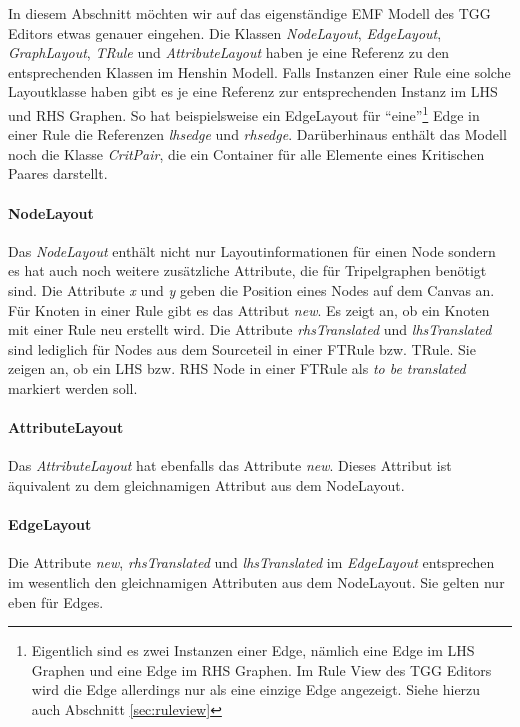 In diesem Abschnitt möchten wir auf das eigenständige EMF Modell des TGG Editors etwas genauer eingehen. Die Klassen \emph{NodeLayout}, \emph{EdgeLayout}, \emph{GraphLayout}, \emph{TRule} und \emph{AttributeLayout} haben je eine Referenz zu den entsprechenden Klassen im Henshin Modell. Falls Instanzen einer Rule eine solche Layoutklasse haben gibt es je eine Referenz zur entsprechenden Instanz im LHS und RHS Graphen. So hat beispielsweise ein EdgeLayout für "`eine"'\footnote{Eigentlich sind es zwei Instanzen einer Edge, nämlich eine Edge im LHS Graphen und eine Edge im RHS Graphen. Im Rule View des TGG Editors wird die Edge allerdings nur als eine einzige Edge angezeigt. Siehe hierzu auch Abschnitt \ref{sec:ruleview}} Edge in einer Rule die Referenzen \emph{lhsedge} und \emph{rhsedge}.
Darüberhinaus enthält das Modell noch die Klasse \emph{CritPair}, die ein Container für alle Elemente eines Kritischen Paares darstellt.

\paragraph{NodeLayout}
Das \emph{NodeLayout} enthält nicht nur Layoutinformationen für einen Node sondern es hat auch noch weitere zusätzliche Attribute, die für Tripelgraphen benötigt sind. Die Attribute \emph{x} und \emph{y} geben die Position eines Nodes auf dem Canvas an. Für Knoten in einer Rule gibt es  das Attribut \emph{new}. Es zeigt an, ob ein Knoten mit einer Rule neu erstellt wird. Die Attribute \emph{rhsTranslated} und \emph{lhsTranslated} sind lediglich für Nodes aus dem Sourceteil in einer FTRule bzw. TRule. Sie zeigen an, ob ein LHS bzw. RHS Node in einer FTRule als \emph{to be translated} markiert werden soll.
\paragraph{AttributeLayout}
Das \emph{AttributeLayout} hat ebenfalls das Attribute \emph{new}. Dieses Attribut ist äquivalent zu dem gleichnamigen Attribut aus dem NodeLayout.
\paragraph{EdgeLayout}
Die Attribute \emph{new}, \emph{rhsTranslated} und \emph{lhsTranslated} im \emph{EdgeLayout} entsprechen im wesentlich den gleichnamigen Attributen aus dem NodeLayout. Sie gelten nur eben für Edges.
